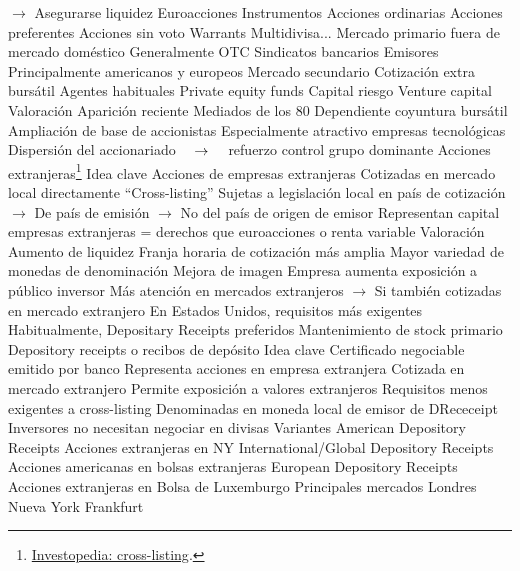 \documentclass{nuevotema}
\begin{document}
\begin{esquemal}
				\4[] $\to$ Asegurarse liquidez
	\1 
		\2 Euroacciones
			\3 Instrumentos
				\4 Acciones ordinarias
				\4 Acciones preferentes
				\4 Acciones sin voto
				\4 Warrants
				\4 Multidivisa...
			\3 Mercado primario
				\4 fuera de mercado doméstico
				\4 Generalmente OTC
				\4 Sindicatos bancarios
				\4 Emisores
				\4[] Principalmente americanos y europeos
			\3 Mercado secundario
				\4 Cotización extra bursátil
				\4 Agentes habituales
				\4[] Private equity funds
				\4[] Capital riesgo
				\4[] Venture capital
			\3 Valoración
				\4 Aparición reciente
				\4[] Mediados de los 80
				\4 Dependiente coyuntura bursátil
				\4 Ampliación de base de accionistas
				\4[] Especialmente atractivo empresas tecnológicas
				\4 Dispersión del accionariado
				\4[] $\quad \rightarrow \quad$ refuerzo control grupo dominante
		\2 Acciones extranjeras\footnote{\href{https://www.investopedia.com/terms/c/cross-listing.asp}{Investopedia: cross-listing}.}
			\3 Idea clave
				\4 Acciones de empresas extranjeras
				\4 Cotizadas en mercado local directamente
				\4 ``Cross-listing''
				\4 Sujetas a legislación local en país de cotización
				\4[] $\to$ De país de emisión
				\4[] $\to$ No del país de origen de emisor
				\4 Representan capital empresas extranjeras
				\4[] = derechos que euroacciones o renta variable
			\3 Valoración
				\4 Aumento de liquidez
				\4[] Franja horaria de cotización más amplia
				\4[] Mayor variedad de monedas de denominación
				\4 Mejora de imagen
				\4[] Empresa aumenta exposición a público inversor
				\4[] Más atención en mercados extranjeros
				\4[] $\to$ Si también cotizadas en mercado extranjero
				\4 En Estados Unidos, requisitos más exigentes
				\4[] Habitualmente, Depositary Receipts preferidos
				\4 Mantenimiento de stock primario
		\2 Depository receipts o recibos de depósito
			\3 Idea clave
				\4 Certificado negociable emitido por banco
				\4 Representa acciones en empresa extranjera
				\4[] Cotizada en mercado extranjero
				\4 Permite exposición a valores extranjeros
				\4 Requisitos menos exigentes a cross-listing
				\4 Denominadas en moneda local de emisor de DRececeipt
				\4[] Inversores no necesitan negociar en divisas
			\3 Variantes
				\4 American Depository Receipts
				\4[] Acciones extranjeras en NY
				\4 International/Global Depository Receipts
				\4[] Acciones americanas en bolsas extranjeras
				\4 European Depository Receipts
				\4[] Acciones extranjeras en Bolsa de Luxemburgo
			\3 Principales mercados
				\4 Londres
				\4 Nueva York
				\4 Frankfurt

\end{esquemal}
\end{document}
